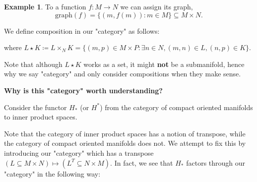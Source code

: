 \documentclass[12pt]{amsart}
\numberwithin{equation}{section}
\theoremstyle{definition}
\newtheorem{Example}[equation]{Example}
\numberwithin{figure}{section}
\newcommand{\Hom}{\operatorname{Hom}}
\begin{document}
\begin{Example}
	To a function $f:M \to N$ we can assign its graph,
	\[ \text{graph}(f) = \{(m, f(m)) : m \in M\} \subseteq M \times N.
	\]
\end{Example}

We define composition in our "category" as follows:

\begin{center}
\end{center}
where $L\star K \coloneqq L \times_N K = \{ (m,p) \in M\times P: \exists n\in N, (m, n) \in L, (n,p) \in K\}$.

Note that although $L\star K$ works as a set, it might \textbf{not} be a submanifold, hence why we say "category" and only consider compositions when they make sense.

\textbf{Why is this "category" worth understanding?}

Consider the functor $H_*$ (or $H^*$) from the category of compact oriented manifolds to inner product spaces.

Note that the category of inner product spaces has a notion of transpose, while the category of compact oriented manifolds does not. We attempt to fix this by introducing our "category" which has a transpose $(L \subseteq M\times N) \mapsto (L^T \subseteq N\times M)$. In fact, we see that $H_*$ factors through our "category" in the following way:

\begin{center}
\end{center}
\end{document}
